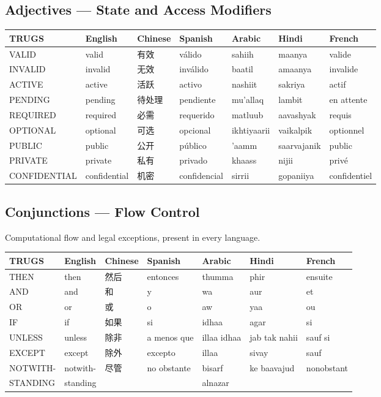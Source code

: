 \documentclass{article}
\begin{document}
\begin{CJK}{UTF8}{gbsn}
\subsection{Adjectives --- State and Access Modifiers}

\begin{table}[h]
\centering
\small
\begin{tabular}{lllllll}
\toprule
\textbf{TRUGS} & \textbf{English} & \textbf{Chinese} & \textbf{Spanish} & \textbf{Arabic} & \textbf{Hindi} & \textbf{French} \\
\midrule
VALID & valid & 有效 & v\'alido & sahiih & maanya & valide \\
INVALID & invalid & 无效 & inv\'alido & baatil & amaanya & invalide \\
ACTIVE & active & 活跃 & activo & nashiit & sakriya & actif \\
PENDING & pending & 待处理 & pendiente & mu'allaq & lambit & en attente \\
REQUIRED & required & 必需 & requerido & matluub & aavashyak & requis \\
OPTIONAL & optional & 可选 & opcional & ikhtiyaarii & vaikalpik & optionnel \\
PUBLIC & public & 公开 & p\'ublico & 'aamm & saarvajanik & public \\
PRIVATE & private & 私有 & privado & khaass & nijii & priv\'e \\
CONFIDENTIAL & confidential & 机密 & confidencial & sirrii & gopaniiya & confidentiel \\
\bottomrule
\end{tabular}
\end{table}

\subsection{Conjunctions --- Flow Control}

Computational flow and legal exceptions, present in every language.

\begin{table}[h]
\centering
\small
\begin{tabular}{lllllll}
\toprule
\textbf{TRUGS} & \textbf{English} & \textbf{Chinese} & \textbf{Spanish} & \textbf{Arabic} & \textbf{Hindi} & \textbf{French} \\
\midrule
THEN & then & 然后 & entonces & thumma & phir & ensuite \\
AND & and & 和 & y & wa & aur & et \\
OR & or & 或 & o & aw & yaa & ou \\
IF & if & 如果 & si & idhaa & agar & si \\
UNLESS & unless & 除非 & a menos que & illaa idhaa & jab tak nahii & sauf si \\
EXCEPT & except & 除外 & excepto & illaa & sivay & sauf \\
NOTWITH- & notwith- & 尽管 & no obstante & bisarf & ke baavajud & nonobstant \\
STANDING & standing & & & alnazar & & \\
\bottomrule
\end{tabular}
\end{table}


\end{CJK}
\end{document}

